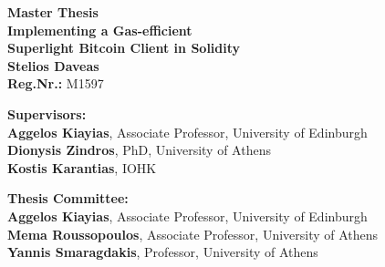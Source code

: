 \begin{center}
    \vspace{3cm}
    \large \textbf{Master Thesis}\\
    \vspace{3cm}
    \textbf{Implementing a Gas-efficient\\Superlight Bitcoin Client in Solidity}\\
    \vspace{3cm}
    \large \textbf{Stelios Daveas}\\
    \textbf{Reg.Nr.:} M1597

    \vspace{5cm}
    \begin{flushleft}
        \textbf{Supervisors:}\\
        \hspace{2cm}
        \textbf{Aggelos Kiayias}, Associate Professor, University of Edinburgh\\
        \hspace{2cm}
        \textbf{Dionysis Zindros}, PhD, University of Athens\\
        \hspace{2cm}
        \textbf{Kostis Karantias}, IOHK

        \vspace{1cm}

        \textbf{Thesis Committee:}\\
        \hspace{2cm}
        \textbf{Aggelos Kiayias}, Associate Professor, University of Edinburgh\\
        \hspace{2cm}
        \textbf{Mema Roussopoulos}, Associate Professor, University of Athens\\
        \hspace{2cm}
        \textbf{Yannis Smaragdakis}, Professor, University of Athens

    \end{flushleft}
\end{center}
\pagebreak
